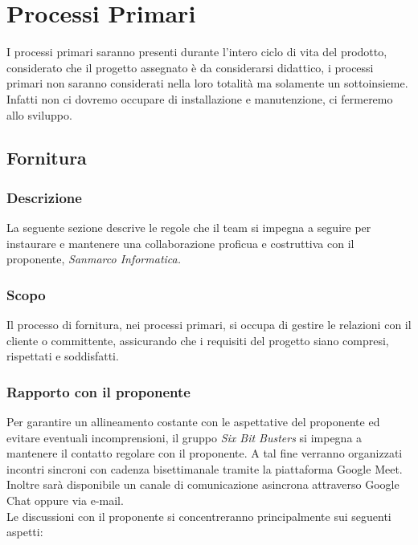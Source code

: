 \section{Processi Primari}
I processi primari saranno presenti durante l'intero ciclo di vita del prodotto, 
considerato che il progetto assegnato è da considerarsi didattico, i processi 
primari non saranno considerati nella loro totalità ma solamente un sottoinsieme.\\
Infatti non ci dovremo occupare di installazione e manutenzione, ci fermeremo allo sviluppo.

    \subsection{Fornitura}
        \subsubsection{Descrizione}
        La seguente sezione descrive le regole che il team si impegna a seguire 
        per instaurare e mantenere una collaborazione proficua e costruttiva con il proponente, 
        \textit{Sanmarco Informatica.}

        \subsubsection{Scopo}
        Il processo di fornitura, nei processi primari, si occupa di gestire le relazioni 
        con il cliente o committente, assicurando che i requisiti del progetto siano 
        compresi, rispettati e soddisfatti.

        \subsubsection{Rapporto con il proponente}
        Per garantire un allineamento costante con le aspettative del proponente ed evitare eventuali incomprensioni,
        il gruppo \textit{Six Bit Busters} si impegna a mantenere il contatto regolare con il proponente.
        A tal fine verranno organizzati incontri sincroni con cadenza bisettimanale tramite la piattaforma Google Meet. 
        Inoltre sarà disponibile un canale di comunicazione asincrona attraverso Google Chat oppure via e-mail.\\


        Le discussioni con il proponente si concentreranno principalmente sui seguenti aspetti:

